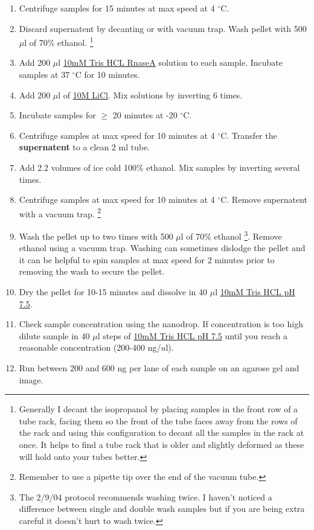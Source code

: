 \documentclass[12pt]{article}
\theoremstyle{definition}
\begin{document}
\begin{enumerate}
	\item Centrifuge samples for 15 minutes at max speed at 4  $^{\circ}$C.
	
	\item Discard supernatent by decanting or with vacuum trap. Wash pellet with 500 $\mu$l of 70\% ethanol. \footnote{Generally I decant the isopropanol by placing samples in the front row of a tube rack, facing them so the front of the tube faces away from the rows of the rack and using this configuration to decant all the samples in the rack at once. It helps to find a tube rack that is older and slightly deformed as these will hold onto your tubes better.}
	
	\item Add 200 $\mu$l \hyperref[sec:tris]{10mM Tris HCL RnaseA} solution to each sample. Incubate samples at 37 $^{\circ}$C for 10 minutes.
	
	\item Add 200 $\mu$l of \hyperref[sec:licl]{10M LiCl}. Mix solutions by inverting 6 times.
	
	\item Incubate samples for $ \geq$ 20 minutes at -20 $^{\circ}$C.
	
	\item  Centrifuge samples at max speed for 10 minutes at 4  $^{\circ}$C. Transfer the \textbf{supernatent} to a clean 2 ml tube.
	
	\item Add 2.2 volumes of ice cold 100\% ethanol. Mix samples by inverting several times.
	
	\item Centrifuge samples at max speed for 10 minutes at 4  $^{\circ}$C. Remove supernatent with a vacuum trap. \footnote{Remember to use a pipette tip over the end of the vacuum tube.}
	
	\item Wash the pellet up to two times with 500 $\mu$l of 70\% ethanol \footnote{The 2/9/04 protocol recommends washing twice. I haven't noticed a difference between single and double wash samples but if you are being extra careful it doesn't hurt to wash twice.}. Remove ethanol using a vacuum trap. Washing can sometimes dislodge the pellet and it can be helpful to spin samples at max speed for 2 minutes prior to removing the wash to secure the pellet.
	
	\item Dry the pellet for 10-15 minutes and dissolve in 40 $\mu$l \hyperref[sec:tris]{10mM Tris HCL pH 7.5}. 
	
	\item Check sample concentration using the nanodrop. If concentration is too high dilute sample in 40 $\mu$l steps of \hyperref[sec:tris]{10mM Tris HCL pH 7.5} until you reach a reasonable concentration (200-400 ng/$u$l).
	
	\item Run between 200 and 600 ng per lane of each sample on an agarose gel and image.
	

\end{enumerate}
\end{document}
